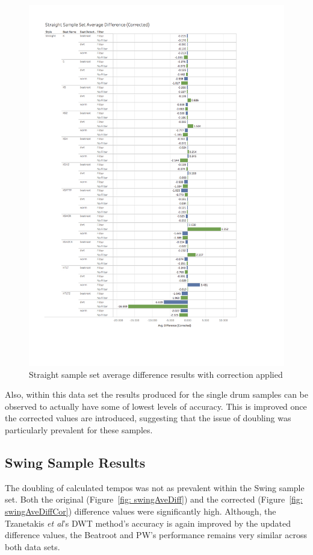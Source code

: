 \documentclass[a4paper, 11pt]{article}
\begin{document}
\begin{figure}[h]
\centering
\includegraphics[scale=0.38]{images/SSSADC.jpg}
\caption{Straight sample set average difference results with correction applied}
\label{fig: stradAveDiffCor}
\end{figure}

Also, within this data set the results produced for the single drum samples can be observed to actually have some of lowest levels of accuracy. This is improved once the corrected values are introduced, suggesting that the issue of doubling was particularly prevalent for these samples. 

\subsection{Swing Sample Results}
The doubling of calculated tempos was not as prevalent within the Swing sample set. Both the original (Figure~\ref{fig: swingAveDiff}) and the corrected (Figure~\ref{fig: swingAveDiffCor}) difference values were significantly high. Although, the Tzanetakis \textit{et al}'s \cite{tzane1} DWT method's accuracy is again improved by the updated difference values, the Beatroot and PW's performance remains very similar across both data sets.
\end{document}
